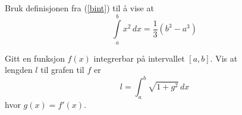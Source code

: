 Bruk definisjonen fra (\ref{bint}) til å vise at
\[ \int\limits_a^b x^2 \,dx = \frac{1}{3}(b^3-a^3) \]

\newpage
{}
Gitt en funksjon $ f(x) $ integrerbar på intervallet $ [a, b] $. Vis at \\lengden $ l $ til grafen til $ f $ er
\[ l=\int_{a}^{b} \sqrt{1+g^2}\,dx \]
hvor $ g(x)=f'(x) $.

